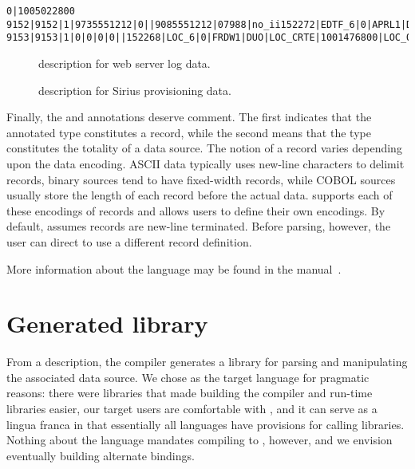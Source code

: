 \documentclass[times]{acm-sigplan}
\newcommand{\dibbler}{Sirius}
\begin{document}
\begin{figure*}
\begin{small}
\begin{center}
\begin{verbatim}
0|1005022800
9152|9152|1|9735551212|0||9085551212|07988|no_ii152272|EDTF_6|0|APRL1|DUO|10|1000295291
9153|9153|1|0|0|0|0||152268|LOC_6|0|FRDW1|DUO|LOC_CRTE|1001476800|LOC_OS_10|1001649601
\end{verbatim}
\caption{Tiny example of \dibbler{} provisioning data.}
\label{figure:dibbler-records}
\end{center}
\end{small}
\end{figure*}


\begin{figure}

\caption{\pads{} description for web server log data.}
\label{figure:wsl}
\end{figure}

\begin{figure}

\caption{\pads{} description for \dibbler{} provisioning data.}
\label{figure:dibbler}
\end{figure}


Finally, the  and  annotations deserve comment.  The first
indicates that the annotated type constitutes a record,
while the second means that the type constitutes the totality of a data source.  
The notion of a record varies depending upon the data encoding.  
ASCII data typically uses new-line characters to delimit 
records, binary sources tend to have fixed-width records, while 
COBOL sources usually store the length of each record before the actual data.
\pads{} supports each of these encodings of records and allows users to define
their own encodings.  By default, \pads{} assumes records are new-line terminated.
Before parsing, however, the user can direct \pads{} to use a different record
definition.

More information about the \pads{} language may be found in the
\pads{} manual~\cite{padsmanual}.

\section{Generated library}
From a description, the \pads{} compiler generates a \C{} library
for parsing and manipulating the associated data source.  We chose \C{}
as the target language for pragmatic reasons: there were 
libraries that made building the compiler and run-time libraries easier,
our target users are comfortable with \C{}, and it can serve 
as a lingua franca in that essentially all languages have provisions for 
calling \C{} libraries.  Nothing about the \pads{} language mandates compiling
to \C{}, however, and we envision eventually building alternate bindings.
\end{document}
